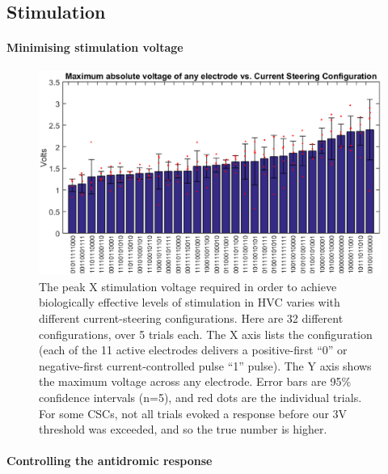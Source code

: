 \documentclass[10pt,letterpaper]{article}
\renewcommand{\subsubsection}[1]{\paragraph{#1}}
\begin{document}
\subsection{Stimulation}

\subsubsection{Minimising stimulation voltage}

\begin{figure}
  \includegraphics[width=\textwidth]{VoltageVsCSC}
  \caption{The peak X stimulation voltage required in order to achieve biologically effective levels of stimulation in HVC varies with different current-steering configurations.  Here are 32 different configurations, over 5 trials each.  The X axis lists the configuration (each of the 11 active electrodes delivers a positive-first ``0'' or negative-first current-controlled pulse ``1'' pulse).  The Y axis shows the maximum voltage across any electrode.  Error bars are 95\% confidence intervals (n=5), and red dots are the individual trials.  For some CSCs, not all trials evoked a response before our 3V threshold was exceeded, and so the true number is higher.}
  \label{fig:VoltageVsCSC}
\end{figure}

\subsubsection{Controlling the antidromic response}
\end{document}

